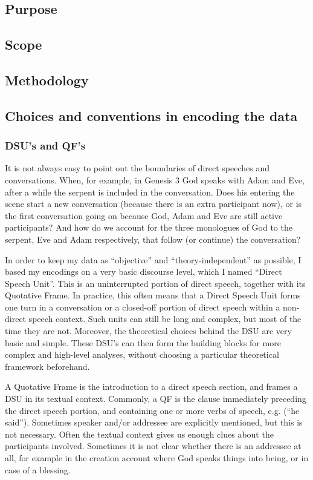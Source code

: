 \documentclass[twoside,a4paper,10pt]{article}
\newcommand{\hebr}[1]{\cjRL{#1}}
\begin{document}
\subsection{Purpose}
\subsection{Scope}
\subsection{Methodology}
\subsection{Choices and conventions in encoding the data}
\subsubsection{DSU's and QF's}
It is not always easy to point out the boundaries of direct speeches and conversations. When, for example, in Genesis 3 God speaks with Adam and Eve, after a while the serpent is included in the conversation. Does his entering the scene start a new conversation (because there is an extra participant now), or is the first conversation going on because God, Adam and Eve are still active participants? And how do we account for the three monologues of God to the serpent, Eve and Adam respectively, that follow (or continue) the conversation?

In order to keep my data as ``objective'' and ``theory-independent'' as possible, I based my encodings on a very basic discourse level, which I named ``Direct Speech Unit''. This is an uninterrupted portion of direct speech, together with its Quotative Frame. In practice, this often means that a Direct Speech Unit forms one turn in a conversation or a closed-off portion of direct speech within a non-direct speech context. Such units can still be long and complex, but most of the time they are not. Moreover, the theoretical choices behind the DSU are very basic and simple. These DSU's can then form the building blocks for more complex and high-level analyses, without choosing a particular theoretical framework beforehand. 

A Quotative Frame is the introduction to a direct speech section, and frames a DSU in its textual context. Commonly, a QF is the clause immediately preceding the direct speech portion, and containing one or more verbs of speech, e.g. \hebr{WJMR} (``he said''). Sometimes speaker and/or addressee are explicitly mentioned, but this is not necessary. Often the textual context gives us enough clues about the participants involved. Sometimes it is not clear whether there is an addressee at all, for example in the creation account where God speaks things into being, or in case of a blessing.
\end{document}
